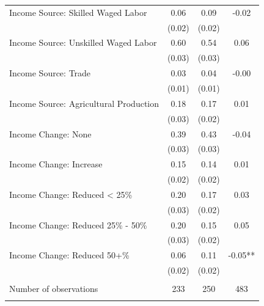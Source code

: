 \begin{tabular}{@{\extracolsep{5pt}}lccc}
Income Source: Skilled Waged Labor   & 0.06    & 0.09    & -0.02   \\
 & (0.02)  & (0.02)  &  \\ [1ex]
Income Source: Unskilled Waged Labor   & 0.60    & 0.54    & 0.06   \\
 & (0.03)  & (0.03)  &  \\ [1ex]
Income Source: Trade   & 0.03    & 0.04    & -0.00   \\
 & (0.01)  & (0.01)  &  \\ [1ex]
Income Source: Agricultural Production   & 0.18    & 0.17    & 0.01   \\
 & (0.03)  & (0.02)  &  \\ [1ex]
Income Change: None   & 0.39    & 0.43    & -0.04   \\
 & (0.03)  & (0.03)  &  \\ [1ex]
Income Change: Increase   & 0.15    & 0.14    & 0.01   \\
 & (0.02)  & (0.02)  &  \\ [1ex]
Income Change: Reduced < 25\%   & 0.20    & 0.17    & 0.03   \\
 & (0.03)  & (0.02)  &  \\ [1ex]
Income Change: Reduced 25\% - 50\%   & 0.20    & 0.15    & 0.05   \\
 & (0.03)  & (0.02)  &  \\ [1ex]
Income Change: Reduced 50+\%   & 0.06    & 0.11    & -0.05**   \\
 & (0.02)  & (0.02)  &  \\ [1ex]
\hline \\[-1.8ex]
Number of observations  & 233   & 250  & 483  \\
\hline \hline \\[-1.8ex]

\end{tabular}

